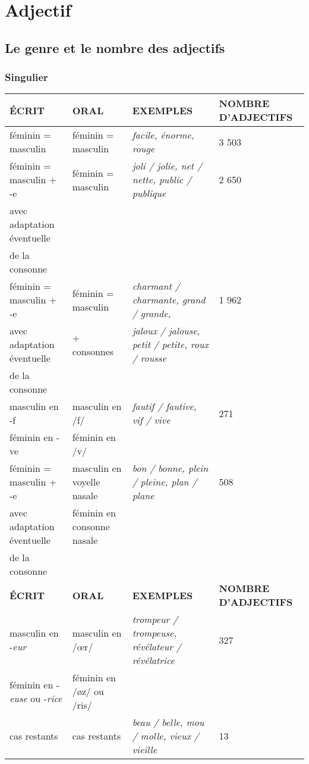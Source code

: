 \documentclass[UTF8]{report}
\begin{document}
\chapter{Adjectif}
\section{ Le genre et le nombre des adjectifs}

\subsection{Singulier}
\begin{table}[H]

\begin{adjustbox}{max width = \textwidth}
        \centering
        \begin{tabular}{|l|l|l|l|}
        \hline
        \rowcolor{cyan!20}
        \textbf{ÉCRIT} & \textbf{ORAL} & \textbf{EXEMPLES} & \textbf{NOMBRE D'ADJECTIFS} \\
        \hline
        féminin = masculin & féminin = masculin & \textit{facile, énorme, rouge} & 3 503 \\
        \hline
        féminin = masculin + -e & féminin = masculin & \textit{joli / jolie, net / nette, public / publique} & 2 650 \\
        avec adaptation éventuelle & & & \\
        de la consonne & & & \\
        \hline
        féminin = masculin + -e & féminin = masculin & \textit{charmant / charmante, grand / grande,} & 1 962 \\
        avec adaptation éventuelle & + consonnes & \textit{jaloux / jalouse, petit / petite, roux / rousse} & \\
        de la consonne & & & \\
        \hline
        masculin en -f & masculin en /f/ & \textit{fautif / fautive, vif / vive} & 271 \\
        féminin en -ve & féminin en /v/ & & \\
        \hline
        féminin = masculin + -e & masculin en voyelle nasale & \textit{bon / bonne, plein / pleine, plan / plane} & 508 \\
        avec adaptation éventuelle & féminin en consonne nasale & & \\
        de la consonne & & & \\
        \hline
        \rowcolor{cyan!20}
        \textbf{ÉCRIT} & \textbf{ORAL} & \textbf{EXEMPLES} & \textbf{NOMBRE D'ADJECTIFS} \\
        \hline
        masculin en -\textit{eur} & masculin en /œr/ & \textit{trompeur / trompeuse, révélateur / révélatrice} & 327 \\
        féminin en -\textit{euse} ou -\textit{rice} & féminin en /øz/ ou /ris/ & & \\
        \hline
        cas restants & cas restants & \textit{beau / belle, mou / molle, vieux / vieille} & 13 \\
        \hline
        \end{tabular}
\end{adjustbox}
\end{table}
\end{document}
